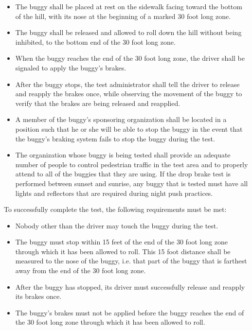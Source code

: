 	\begin{itemize}

		\item
		The buggy shall be placed at rest on the sidewalk facing toward the bottom of
		the hill, with its nose at the beginning of a marked 30 foot long zone.

		\item
		The buggy shall be released and allowed to roll down the hill without being
		inhibited, to the bottom end of the 30 foot long zone.

		\item
		When the buggy reaches the end of the 30 foot long zone, the driver shall be
		signaled to apply the buggy's brakes.

		\item
		After the buggy stops, the test administrator shall tell the driver to release
		and reapply the brakes once, while observing the movement of the buggy to
		verify that the brakes are being released and reapplied.

		\item
		A member of the buggy's sponsoring organization shall be located in a position
		such that he or she will be able to stop the buggy in the event that the
		buggy's braking system fails to stop the buggy during the test.

		\item
		The organization whose buggy is being tested shall provide an adequate number
		of people to control pedestrian traffic in the test area and to properly attend
		to all of the buggies that they are using. If the drop brake test is performed
		between sunset and sunrise, any buggy that is tested must have all lights and
		reflectors that are required during night push practices.

	\end{itemize}

	\noindent To successfully complete the test, the following requirements must be met:

	\begin{itemize}

		\item
		Nobody other than the driver may touch the buggy during the test.

		\item
		The buggy must stop within 15 feet of the end of the 30 foot long zone through
		which it has been allowed to roll. This 15 foot distance shall be measured to
		the nose of the buggy, i.e. that part of the buggy that is farthest away from
		the end of the 30 foot long zone.

		\item
		After the buggy has stopped, its driver must successfully release and reapply
		its brakes once.

		\item
		The buggy's brakes must not be applied before the buggy reaches the end of the
		30 foot long zone through which it has been allowed to roll.

	\end{itemize}

